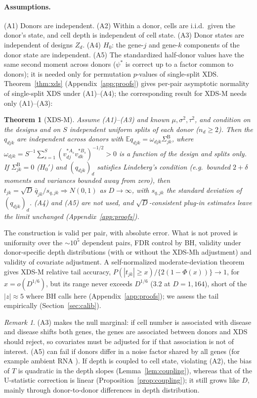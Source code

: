 \documentclass[10pt,letterpaper]{article}
\newtheorem{theorem}{Theorem}
\theoremstyle{definition}
\theoremstyle{remark}
\newtheorem{remark}{Remark}
\newcommand{\SB}{\Sigma^{\mathrm{B}}}
\newcommand{\E}{\mathbb{E}}
\begin{document}
\paragraph{Assumptions.} (A1) Donors are independent. (A2) Within a donor, cells are i.i.d.\ given the donor's state, and cell depth is independent of cell state. (A3) Donor states are independent of designs $Z_d$. (A4) $H_0$: the gene-$j$ and gene-$k$ components of the donor state are independent. (A5) The standardized half-donor values have the same second moment across donors ($\psi^*$ is correct up to a factor common to donors); it is needed only for permutation $p$-values of single-split XDS. Theorem~\ref{thm:xds} (Appendix~\ref{app:proofs}) gives per-pair asymptotic normality of single-split XDS under (A1)--(A4); the corresponding result for XDS-M needs only (A1)--(A3):

\begin{theorem}[XDS-M]\label{thm:xdsm}
Assume (A1)--(A3) and known $\mu,\sigma^2,\tau^2$, and condition on the designs and on $S$ independent uniform splits of each donor ($n_d\ge2$). Then the $q_{djk}$ are independent across donors with $\E q_{djk}=\omega_{djk}\SB_{jk}$, where $\omega_{djk}=S^{-1}\sum_{s=1}^S(v^{*A_s}_{dj}v^{*B_s}_{dk})^{-1/2}>0$ is a function of the design and splits only. If $\SB_{jk}=0$ ($H_0'$) and $(q_{djk})_d$ satisfies Lindeberg's condition (e.g.\ bounded $2+\delta$ moments and variances bounded away from zero), then $t_{jk}=\sqrt D\,\bar q_{jk}/s_{q,jk}\Rightarrow N(0,1)$ as $D\to\infty$, with $s_{q,jk}$ the standard deviation of $(q_{djk})_d$. (A4) and (A5) are not used, and $\sqrt D$-consistent plug-in estimates leave the limit unchanged (Appendix~\ref{app:proofs}).
\end{theorem}

The construction is valid per pair, with absolute error. What is not proved is uniformity over the $\sim\!10^5$ dependent pairs, FDR control by BH, validity under donor-specific depth distributions (with or without the XDS-Mh adjustment) and validity of covariate adjustment. A self-normalized moderate-deviation theorem \citep{JingShaoWang2003} gives XDS-M relative tail accuracy, $P(|t_{jk}|\ge x)/\{2(1-\Phi(x))\}\to1$, for $x=o(D^{1/6})$, but its range never exceeds $D^{1/6}$ ($3.2$ at $D=1{,}164$), short of the $|z|\approx5$ where BH calls here (Appendix~\ref{app:proofs}); we assess the tail empirically (Section~\ref{sec:calib}).

\begin{remark}\label{rem:assump}
(A3) makes the null marginal: if cell number is associated with disease and disease shifts both genes, the genes are associated between donors and XDS should reject, so covariates must be adjusted for if that association is not of interest. (A5) can fail if donors differ in a noise factor shared by all genes (for example ambient RNA \citep{Fleming2023CellBender}). If depth is coupled to cell state, violating (A2), the bias of $T$ is quadratic in the depth slopes (Lemma~\ref{lem:coupling}), whereas that of the U-statistic correction is linear (Proposition~\ref{prop:coupling}); it still grows like $D$, mainly through donor-to-donor differences in depth distribution.
\end{remark}
\end{document}
